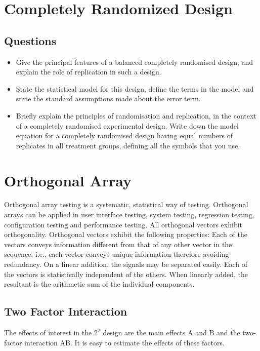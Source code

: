 \newpage

\section{Completely Randomized Design}

\subsection{Questions}
\begin{itemize}
	\item Give the principal features of a  balanced completely randomised design, and
	explain the role of replication in such a design.  \item State the statistical model for
	this design, define the terms in the model and state the standard assumptions
	made about the error term.
	\item Briefly explain the principles of randomisation and replication, in the
	context of a completely randomised experimental design. Write down the model equation for a completely randomised design
	having equal numbers of replicates in all treatment groups, defining all
	the symbols that you use.
\end{itemize}
\section{Orthogonal Array}
Orthogonal array testing is a systematic, statistical way of testing. Orthogonal arrays can be applied in user interface testing, system testing, regression testing, configuration testing and performance testing.
All orthogonal vectors exhibit orthogonality. Orthogonal vectors exhibit the following properties:
Each of the vectors conveys information different from that of any other vector in the sequence, i.e., each vector conveys unique information therefore avoiding redundancy.
On a linear addition, the signals may be separated easily.
Each of the vectors is statistically independent of the others.
When linearly added, the resultant is the arithmetic sum of the individual components.


\subsection{Two Factor Interaction}
The effects of interest in the $2^2$ design are the  main effects A and B and the two-factor interaction AB. It is easy to estimate the effects of these factors.


